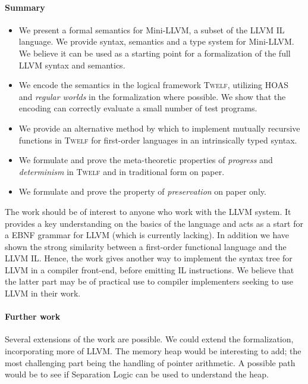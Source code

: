 \documentclass[a4paper, oneside, 10pt, draft]{memoir}
\newcommand{\twelf}{\textsc{Twelf}}
\begin{document}
\paragraph{Summary}
\begin{itemize}
\item We present a formal semantics for Mini-LLVM, a subset of the
  LLVM IL language. We provide syntax, semantics and a type system for
  Mini-LLVM. We believe it can be used as a starting point for a
  formalization of the full LLVM syntax and semantics.
\item We encode the semantics in the logical framework \twelf{},
  utilizing HOAS and \emph{regular worlds} in the formalization where
  possible. We show that the encoding can correctly evaluate a small
  number of test programs.
\item We provide an alternative method by which to implement mutually
  recursive functions in \twelf{} for first-order languages in an
  intrinsically typed syntax.
\item We formulate and prove the meta-theoretic properties of
  \emph{progress} and \emph{determinism} in \twelf{} and in
  traditional form on paper.
\item We formulate and prove the property of \emph{preservation} on
  paper only.
\end{itemize}

The work should be of interest to anyone who work with the LLVM
system. It provides a key understanding on the basics of the language
and acts as a start for a EBNF grammar for LLVM (which is currently
lacking). In addition we have shown the strong similarity between a
first-order functional language and the LLVM IL. Hence, the work gives
another way to implement the syntax tree for LLVM in a compiler
front-end, before emitting IL instructions. We believe that the latter
part may be of practical use to compiler implementers seeking to use
LLVM in their work.

\paragraph{Further work}

Several extensions of the work are possible. We could extend the
formalization, incorporating more of LLVM. The memory heap would be
interesting to add; the most challenging part being the handling of
pointer arithmetic. A possible path would be to see if Separation
Logic\cite{reynolds:2002:separationlogic} can be used to understand
the heap.
\end{document}
